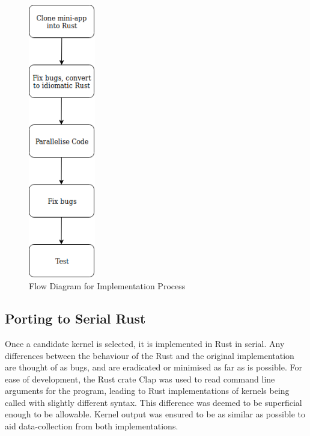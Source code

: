 \begin{figure}
  \center
  \includegraphics[height=12cm]{figs/ImplementationFlow.png}
  \caption{Flow Diagram for Implementation Process}
  \label{fig:imp-flow}
\end{figure}

\subsection{Porting to Serial Rust}
Once a candidate kernel is selected, it is implemented in Rust in serial. Any differences between the  behaviour of the Rust and the original implementation are thought of as bugs, and are eradicated or minimised as far as is possible. For ease of development, the Rust crate Clap was used to read command line arguments for the program, leading to Rust implementations of kernels being called with slightly different syntax. This difference was deemed to be superficial enough to be allowable. Kernel output was ensured to be as similar as possible to aid data-collection from both implementations.

